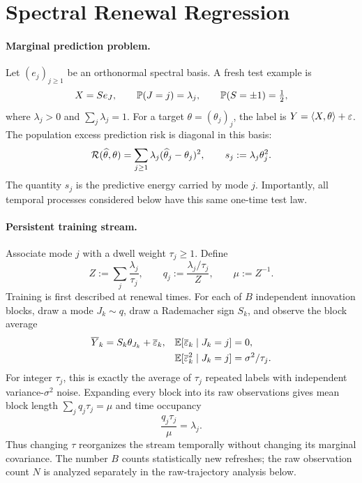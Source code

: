 \section{Spectral Renewal Regression}

\paragraph{Marginal prediction problem.}
Let $(e_j)_{j\ge1}$ be an orthonormal spectral basis.  A fresh test example is
\begin{equation}
X=Se_J,
\qquad \mathbb{P}(J=j)=\lambda_j,
\qquad \mathbb{P}(S=\pm1)=\tfrac12,
\label{eq:test-law}
\end{equation}
where $\lambda_j>0$ and $\sum_j\lambda_j=1$.  For a target
$\theta=(\theta_j)_j$, the label is $Y=\langle X,\theta\rangle+\varepsilon$.
The population excess prediction risk is diagonal in this basis:
\begin{equation}
\mathcal{R}(\widehat\theta,\theta)
=\sum_{j\ge1}\lambda_j(\widehat\theta_j-\theta_j)^2,
\qquad s_j:=\lambda_j\theta_j^2.
\label{eq:risk-source}
\end{equation}
The quantity $s_j$ is the predictive energy carried by mode $j$.  Importantly,
all temporal processes considered below have this same one-time test law.

\paragraph{Persistent training stream.}
Associate mode $j$ with a dwell weight $\tau_j\ge1$.  Define
\begin{equation}
Z:=\sum_j\frac{\lambda_j}{\tau_j},
\qquad
q_j:=\frac{\lambda_j/\tau_j}{Z},
\qquad
\mu:=Z^{-1}.
\label{eq:q-def}
\end{equation}
Training is first described at renewal times.  For each of $B$ independent
innovation blocks, draw a mode $J_k\sim q$, draw a Rademacher sign $S_k$, and
observe the block average
\begin{align}
\overline Y_k&=S_k\theta_{J_k}+\overline{\varepsilon}_k,
&\mathbb{E}[\overline{\varepsilon}_k\mid J_k=j]&=0,\nonumber\\
&&\mathbb{E}[\overline{\varepsilon}_k^2\mid J_k=j]&=\sigma^2/\tau_j.
\label{eq:block-observation}
\end{align}
For integer $\tau_j$, this is exactly the average of $\tau_j$ repeated labels
with independent variance-$\sigma^2$ noise.  Expanding every block into its raw
observations gives mean block length
$\sum_jq_j\tau_j=\mu$ and time occupancy
\begin{equation}
\frac{q_j\tau_j}{\mu}=\lambda_j.
\label{eq:occupancy-main}
\end{equation}
Thus changing $\tau$ reorganizes the stream temporally without changing its
marginal covariance.  The number $B$ counts statistically new refreshes; the
raw observation count $N$ is analyzed separately in the raw-trajectory
analysis below.

